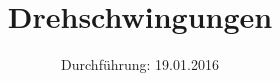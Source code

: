 

\subject{Versuchsprotokoll zum Versuch Nr. 102}
\title{Drehschwingungen}
\date{
  Durchführung: 19.01.2016
}



\maketitle
\newpage






\printbibliography


